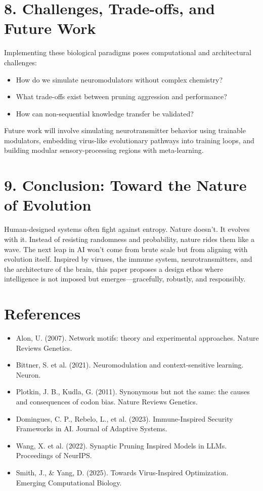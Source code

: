 \documentclass[11pt]{article}
\begin{document}
\section{8. Challenges, Trade-offs, and Future Work}
Implementing these biological paradigms poses computational and architectural challenges:
\begin{itemize}
    \item How do we simulate neuromodulators without complex chemistry?
    \item What trade-offs exist between pruning aggression and performance?
    \item How can non-sequential knowledge transfer be validated?
\end{itemize}
Future work will involve simulating neurotransmitter behavior using trainable modulators, embedding virus-like evolutionary pathways into training loops, and building modular sensory-processing regions with meta-learning.

\section{9. Conclusion: Toward the Nature of Evolution}
Human-designed systems often fight against entropy. Nature doesn’t. It evolves with it. Instead of resisting randomness and probability, nature rides them like a wave. The next leap in AI won't come from brute scale but from aligning with evolution itself. Inspired by viruses, the immune system, neurotransmitters, and the architecture of the brain, this paper proposes a design ethos where intelligence is not imposed but emerges—gracefully, robustly, and responsibly.

\section*{References}
\begin{itemize}
    \item Alon, U. (2007). Network motifs: theory and experimental approaches. Nature Reviews Genetics.
    \item Bittner, S. et al. (2021). Neuromodulation and context-sensitive learning. Neuron.
    \item Plotkin, J. B., Kudla, G. (2011). Synonymous but not the same: the causes and consequences of codon bias. Nature Reviews Genetics.
    \item Domingues, C. P., Rebelo, L., et al. (2023). Immune-Inspired Security Frameworks in AI. Journal of Adaptive Systems.
    \item Wang, X. et al. (2022). Synaptic Pruning Inspired Models in LLMs. Proceedings of NeurIPS.
    \item Smith, J., & Yang, D. (2025). Towards Virus-Inspired Optimization. Emerging Computational Biology.
\end{itemize}
\end{document}
